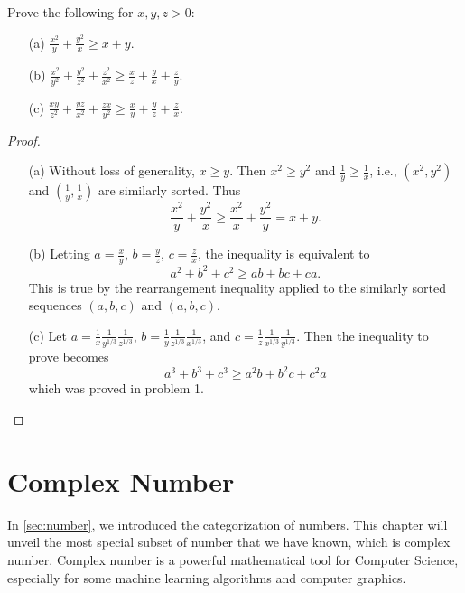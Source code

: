 \documentclass[
	12pt, %
	fleqn, %
	a4paper, %
]{LegrandOrangeBook}
\begin{document}
\begin{exercise}
    Prove the following for \( x, y, z > 0 \):
    \begin{enumerate}
        \item[(a)] \(\frac{x^2}{y} + \frac{y^2}{x} \geq x + y\).
        \item[(b)] \(\frac{x^2}{y^2} + \frac{y^2}{z^2} + \frac{z^2}{x^2} \geq \frac{x}{z} + \frac{y}{x} + \frac{z}{y}\).
        \item[(c)] \(\frac{xy}{z^2} + \frac{yz}{x^2} + \frac{zx}{y^2} \geq \frac{x}{y} + \frac{y}{z} + \frac{z}{x}\).
    \end{enumerate}
\end{exercise}
\begin{proof}
    \begin{enumerate}
        \item[(a)] Without loss of generality, \(x \geq y\). Then \(x^2 \geq y^2\) and \(\frac{1}{y} \geq \frac{1}{x}\), i.e., \((x^2, y^2)\) and \((\frac{1}{y}, \frac{1}{x})\) are similarly sorted. Thus
        \[ \frac{x^2}{y} + \frac{y^2}{x} \geq \frac{x^2}{x} + \frac{y^2}{y} = x + y. \]
    
        \item[(b)] Letting \(a = \frac{x}{y}\), \(b = \frac{y}{z}\), \(c = \frac{z}{x}\), the inequality is equivalent to
        \[ a^2 + b^2 + c^2 \geq ab + bc + ca. \]
        This is true by the rearrangement inequality applied to the similarly sorted sequences \((a, b, c)\) and \((a, b, c)\).
    
        \item[(c)] Let \(a = \frac{1}{x}\frac{1}{y^{1/3}}\frac{1}{z^{1/3}}\), \(b = \frac{1}{y}\frac{1}{z^{1/3}}\frac{1}{x^{1/3}}\), and \(c = \frac{1}{z}\frac{1}{x^{1/3}}\frac{1}{y^{1/3}}\). Then the inequality to prove becomes
        \[ a^3 + b^3 + c^3 \geq a^2b + b^2c + c^2a \]
        which was proved in problem 1.
    \end{enumerate}
\end{proof}
\chapterspaceabove{6.75cm} 
\chapterspacebelow{7.25cm} 
\chapter{Complex Number}
In \autoref{sec:number}, we introduced the categorization of numbers. This chapter will unveil the
most special subset of number that we have known, which is complex number. Complex number is a powerful
mathematical tool for Computer Science, especially for some machine learning algorithms and computer graphics.
\end{document}
